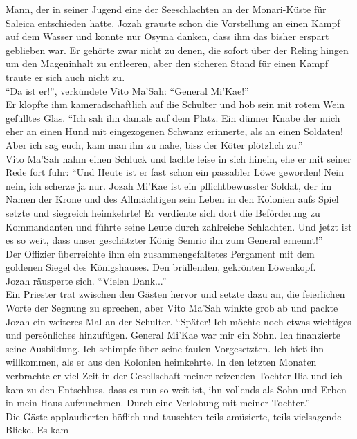Mann, der in seiner Jugend eine der Seeschlachten an der Monari-Küste für Saleica entschieden 
hatte. Jozah grauste schon die Vorstellung an einen Kampf auf dem Wasser und konnte nur Osyma 
danken, dass ihm das bisher erspart geblieben war. Er gehörte zwar nicht zu denen, die sofort über 
der Reling hingen um den Mageninhalt zu entleeren, aber den sicheren Stand für einen Kampf traute 
er sich auch nicht zu.\\
``Da ist er!'', verkündete Vito Ma'Sah: ``General Mi'Kae!''\\
Er klopfte ihm kameradschaftlich auf die Schulter und hob sein mit rotem Wein gefülltes Glas. ``Ich 
sah ihn damals auf dem Platz. Ein dünner Knabe der mich eher an einen Hund mit eingezogenen Schwanz 
erinnerte, als an einen Soldaten! Aber ich sag euch, kam man ihn zu nahe, biss der Köter plötzlich 
zu.''\\
Vito Ma'Sah nahm einen Schluck und lachte leise in sich hinein, ehe er mit seiner Rede fort fuhr: 
``Und Heute ist er fast schon ein passabler Löwe geworden! Nein nein, ich scherze ja nur. Jozah 
Mi'Kae ist ein pflichtbewusster Soldat, der im Namen der Krone und des Allmächtigen sein Leben in 
den Kolonien aufs Spiel setzte und siegreich heimkehrte! Er verdiente sich dort die Beförderung zu 
Kommandanten und führte seine Leute durch zahlreiche Schlachten. Und jetzt ist es so weit, dass 
unser geschätzter König Semric ihn zum General ernennt!''\\
Der Offizier überreichte ihm ein zusammengefaltetes Pergament mit dem goldenen Siegel des 
Königshauses. Den brüllenden, gekrönten Löwenkopf.\\
Jozah räusperte sich. ``Vielen Dank...''\\
Ein Priester trat zwischen den Gästen hervor und setzte dazu an, die feierlichen Worte der Segnung 
zu sprechen, aber Vito Ma'Sah winkte grob ab und packte Jozah ein weiteres Mal an der Schulter. 
``Später! Ich möchte noch etwas wichtiges und persönliches hinzufügen. General Mi'Kae war mir ein 
Sohn. Ich finanzierte seine Ausbildung. Ich schimpfe über seine faulen Vorgesetzten. Ich hieß ihn 
willkommen, als er aus den Kolonien heimkehrte. In den letzten Monaten verbrachte er viel Zeit in 
der Gesellschaft meiner reizenden Tochter Ilia und ich kam zu den Entschluss, dass es nun so weit 
ist, ihn vollends als Sohn und Erben in mein Haus aufzunehmen. Durch eine Verlobung mit meiner 
Tochter.''\\
Die Gäste applaudierten höflich und tauschten teils amüsierte, teils vielsagende Blicke. Es kam 
